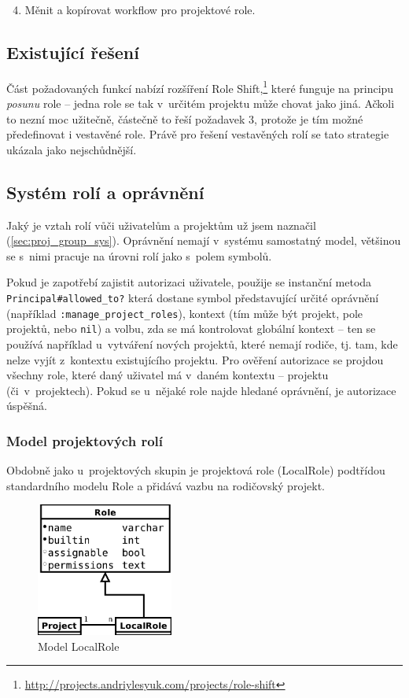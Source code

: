 \documentclass[thesis=B,czech]{FITthesis}[2012/05/02]
\begin{document}
\begin{enumerate}
\setcounter{enumi}{3}
\item
  Měnit a kopírovat workflow pro projektové role.
\end{enumerate}
\subsection{Existující řešení}

Část požadovaných funkcí nabízí rozšíření Role Shift,\footnote{\url{http://projects.andriylesyuk.com/projects/role-shift}}
které funguje na principu \emph{posunu} role -- jedna role se tak
v~určitém projektu může chovat jako jiná. Ačkoli to nezní moc užitečně,
částečně to řeší požadavek 3, protože je tím možné předefinovat i vestavěné
role. Právě pro řešení vestavěných rolí se tato strategie ukázala jako
nejschůdnější.

\subsection{Systém rolí a oprávnění}

Jaký je vztah rolí vůči uživatelům a projektům už jsem naznačil
(\ref{sec:proj_group_sys}). Oprávnění nemají v~systému samostatný model,
většinou se s~nimi pracuje na úrovni rolí jako s~polem symbolů.

Pokud je zapotřebí zajistit autorizaci uživatele, použije se instanční
metoda \lstinline!Principal#allowed_to?! která dostane symbol
představující určité oprávnění (například
\lstinline!:manage_project_roles!), kontext (tím může být projekt, pole
projektů, nebo \lstinline!nil!) a volbu, zda se má kontrolovat globální
kontext -- ten se používá například u~vytváření nových projektů, které
nemají rodiče, tj. tam, kde nelze vyjít z~kontextu existujícího
projektu. Pro ověření autorizace se projdou všechny role, které daný
uživatel má v~daném kontextu -- projektu (či~v~projektech). Pokud se
u~nějaké role najde hledané oprávnění, je autorizace úspěšná.

\subsubsection{Model projektových rolí}

Obdobně jako u~projektových skupin je projektová role (LocalRole)
podtřídou standardního modelu Role a přidává vazbu na rodičovský
projekt.

\begin{figure}[htbp]
\centering
\includegraphics[width=0.4\textwidth]{role-er1.pdf}
\caption{Model LocalRole}
\end{figure}
\end{document}

